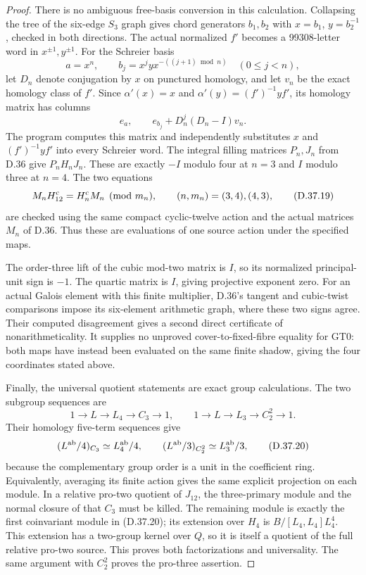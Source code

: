 \begin{proof}
There is no ambiguous free-basis conversion in this
calculation. Collapsing the tree of the six-edge $S_3$
graph gives chord generators $b_1,b_2$ with
$x=b_1$, $y=b_2^{-1}$, checked in both directions.
The actual normalized $f'$ becomes a 99308-letter word
in $x^{\pm1},y^{\pm1}$. For the Schreier basis
\[
 a=x^n,\qquad b_j=x^j yx^{-((j+1)\bmod n)}
                 \quad(0\le j<n),
\]
let $D_n$ denote conjugation by $x$ on punctured homology,
and let $v_n$ be the exact homology class of $f'$.
Since $\alpha'(x)=x$ and
$\alpha'(y)=(f')^{-1}yf'$, its homology matrix has columns
\[
 e_a,\qquad e_{b_j}+D_n^j(D_n-I)v_n.                      \tag{D.37.18}
\]
The program computes this matrix and independently
substitutes $x$ and $(f')^{-1}yf'$ into every Schreier word.
The integral filling matrices $P_n,J_n$ from D.36 give
$P_n H_nJ_n$. These are exactly $-I$ modulo four at
$n=3$ and $I$ modulo three at $n=4$.
The two equations
\[
 M_n H_{12}^{\rm c}=H_n^{\rm c}M_n
       \pmod{m_n},\qquad (n,m_n)=(3,4),(4,3),             \tag{D.37.19}
\]
are checked using the same compact cyclic-twelve action
and the actual matrices $M_n$ of D.36. Thus these are
evaluations of one source action under the specified maps.

The order-three lift of the cubic mod-two matrix is $I$,
so its normalized principal-unit sign is $-1$. The
quartic matrix is $I$, giving projective exponent zero.
For an actual Galois element with this finite multiplier,
D.36's tangent and cubic-twist comparisons impose its
six-element arithmetic graph, where these two signs
agree. Their computed disagreement gives a second direct
certificate of nonarithmeticality. It supplies no
unproved cover-to-fixed-fibre equality for GT0: both
maps have instead been evaluated on the same finite
shadow, giving the four coordinates stated above.

Finally, the universal quotient statements are exact
group calculations. The two subgroup sequences are
\[
 1\to L\to L_4\to C_3\to1,\qquad
 1\to L\to L_3\to C_2^2\to1.
\]
Their homology five-term sequences give
\[
 (L^{\rm ab}/4)_{C_3}\simeq L_4^{\rm ab}/4,\qquad
 (L^{\rm ab}/3)_{C_2^2}\simeq L_3^{\rm ab}/3,             \tag{D.37.20}
\]
because the complementary group order is a unit in the
coefficient ring. Equivalently, averaging its finite
action gives the same explicit projection on each
module. In a relative pro-two quotient of $J_{12}$,
the three-primary module and the normal closure of that
$C_3$ must be killed. The remaining module is exactly
the first coinvariant module in (D.37.20); its extension
over $H_4$ is $B/[L_4,L_4]L_4^4$. This extension has a
two-group kernel over $Q$, so it is itself a quotient
of the full relative pro-two source. This proves both
factorizations and universality. The same argument with
$C_2^2$ proves the pro-three assertion.


\end{proof}
